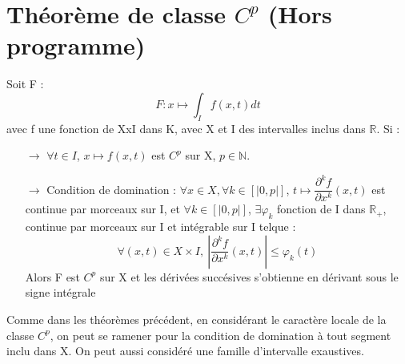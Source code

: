 \section{Théorème de classe $C^p$ (Hors programme)}
\begin{theo}
Soit F :
$$F : x \mapsto \int_I f(x,t) dt$$ 
avec f une fonction de XxI dans K, avec X et I des intervalles inclus dans $\mathbb{R}$. Si : 
\begin{itemize}
 \item[$\rightarrow$] $\forall t \in I$, $x \mapsto f(x,t)$ est $C^p$ sur X, $p \in \mathbb{N}$.
 \item[$\rightarrow$] Condition de domination : $\forall x \in X, \forall k \in [|0,p|]$, $t \mapsto \dfrac{\partial^k f}{\partial x^k}(x,t)$ est continue par morceaux sur I, et $\forall k \in [|0,p|]$, $\exists \varphi_k$ fonction de I dans $\mathbb{R}_+$, continue par morceaux sur I et intégrable sur I telque : 
$$\forall (x,t) \in X \times I,~ |\dfrac{\partial^k f}{\partial x^k}(x,t)|\leq \varphi_k(t)$$
Alors F est $C^p$ sur X et les dérivées succésives s'obtienne en dérivant sous le signe intégrale
\end{itemize}
\end{theo}
\begin{prop}
Comme dans les théorèmes précédent, en considérant le caractère locale de la classe $C^p$, on peut se ramener pour la condition de domination à tout segment inclu dans X. On peut aussi considéré une famille d'intervalle exaustives.
\end{prop}